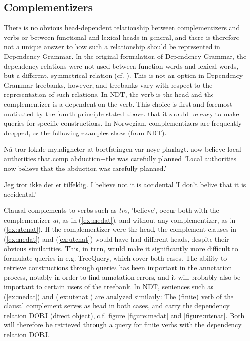 \documentclass[11pt,a4paper]{article}
\begin{document}
\subsection{Complementizers}
There is no obvious head-dependent relationship between complementizers and verbs or between functional and lexical heads in general, and there is therefore not a unique answer to how such a relationship should be represented in Dependency Grammar. In the original formulation of Dependency Grammar, the dependency relations were not used between function words and lexical words, but a different, symmetrical relation (cf. \cite[361-410]{Tes:65}). This is not an option in Dependency Grammar treebanks, however, and treebanks vary with respect to the representation of such relations. In NDT, the verb is the head and the complementizer is a dependent on the verb. This choice is first and foremost motivated by the fourth principle stated above: that it should be easy to make queries for specific constructions. In Norwegian, complementizers are frequently dropped, as the following examples show (from NDT):
\begin{examples}
\item\label{ex:medat}
\gll Nå tror lokale myndigheter at bortføringen var nøye planlagt.
now believe local authorities that.comp abduction+the was carefully planned
\glt 'Local authorities now believe that the abduction was carefully planned.'
\glend

\item\label{ex:utenat}
\gll Jeg tror ikke det er tilfeldig.
I believe not it is accidental
\glt 'I don't belive that it is accidental.'
\glend
\end{examples}
 
Clausal complements to verbs such as \emph{tro}, 'believe', occur both with the complementizer \emph{at}, as in (\ref{ex:medat}), and without any complementizer, as in (\ref{ex:utenat}). If the complementizer were the head, the complement clauses in (\ref{ex:medat}) and (\ref{ex:utenat}) would have had different heads, despite their obvious similarities. This, in turn, would make it significantly more difficult to formulate queries in e.g. TreeQuery, which cover both cases. The ability to retrieve constructions through queries has been important in the annotation process, notably in order to find annotation errors, and it will probably also be important to certain users of the treebank. In NDT, sentences such as (\ref{ex:medat}) and (\ref{ex:utenat}) are analyzed similarly: The (finite) verb of the clausal complement serves as head in both cases, and carry the dependency relation DOBJ (direct object), c.f. figure \ref{figure:medat} and \ref{figure:utenat}. Both will therefore be retrieved through a query for finite verbs with the dependency relation DOBJ.
\end{document}
